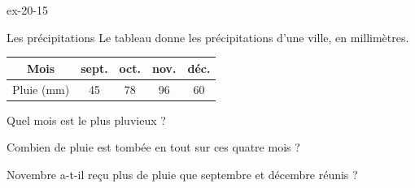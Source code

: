 \begin{blocLivre}{ex-20-15}\begin{exercice}[3]{Les précipitations}
Le tableau donne les précipitations d’une ville, en millimètres.\begin{center}\renewcommand{\arraystretch}{1.35}\begin{tabular}{c|cccc}\toprule
Mois & sept. & oct. & nov. & déc.\\\midrule
Pluie (mm) & 45 & 78 & 96 & 60\\
\bottomrule\end{tabular}\end{center}\begin{questions}
\item Quel mois est le plus pluvieux ?
\item Combien de pluie est tombée en tout sur ces quatre mois ?
\item Novembre a-t-il reçu plus de pluie que septembre et décembre réunis ?
\end{questions}
\end{exercice}\end{blocLivre}

\clearpage
